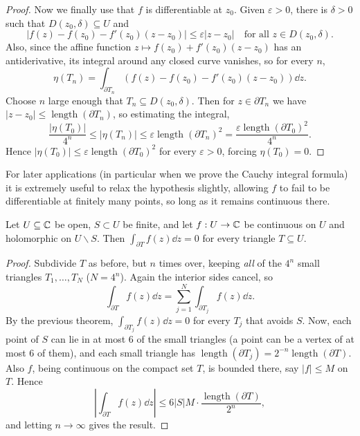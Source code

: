 \documentclass[a4paper]{scrartcl}
\begin{document}
\begin{proof}
    Now we finally use that $f$ is differentiable at $z_0$. Given $\varepsilon > 0$, there is $\delta > 0$ such that $D(z_0, \delta) \subseteq U$ and
    $$
    |f(z) - f(z_0) - f'(z_0)(z - z_0)| \leq \varepsilon|z - z_0| \quad \text{for all } z \in D(z_0, \delta).
    $$
    Also, since the affine function $z \mapsto f(z_0) + f'(z_0)(z - z_0)$ has an antiderivative, its integral around any closed curve vanishes, so for every $n$,
    $$
    \eta(T_n) = \int_{\partial T_n} \left(f(z) - f(z_0) - f'(z_0)(z - z_0)\right) \dd z.
    $$
    Choose $n$ large enough that $T_n \subseteq D(z_0, \delta)$. Then for $z \in \partial T_n$ we have $|z - z_0| \leq \operatorname{length}(\partial T_n)$, so estimating the integral,
    $$
    \frac{|\eta(T_0)|}{4^n} \leq |\eta(T_n)| \leq \varepsilon \operatorname{length}(\partial T_n)^2 = \frac{\varepsilon \operatorname{length}(\partial T_0)^2}{4^n}.
    $$
    Hence $|\eta(T_0)| \leq \varepsilon \operatorname{length}(\partial T_0)^2$ for every $\varepsilon > 0$, forcing $\eta(T_0) = 0$.
\end{proof}

For later applications (in particular when we prove the Cauchy integral formula) it is extremely useful to relax the hypothesis slightly, allowing $f$ to fail to be differentiable at finitely many points, so long as it remains continuous there.

\begin{theorem}
    Let $U \subseteq \mathbb{C}$ be open, $S \subset U$ be finite, and let $f: U \rightarrow \mathbb{C}$ be continuous on $U$ and holomorphic on $U \backslash S$. Then $\int_{\partial T} f(z) \dd z = 0$ for every triangle $T \subseteq U$.
\end{theorem}
\begin{proof}
    Subdivide $T$ as before, but $n$ times over, keeping \emph{all} of the $4^n$ small triangles $T_1, \dots, T_N$ ($N = 4^n$). Again the interior sides cancel, so
    $$
    \int_{\partial T} f(z) \dd z = \sum_{j = 1}^{N} \int_{\partial T_j} f(z) \dd z.
    $$
    By the previous theorem, $\int_{\partial T_j} f(z) \dd z = 0$ for every $T_j$ that avoids $S$. Now, each point of $S$ can lie in at most $6$ of the small triangles (a point can be a vertex of at most $6$ of them), and each small triangle has $\operatorname{length}(\partial T_j) = 2^{-n}\operatorname{length}(\partial T)$. Also $f$, being continuous on the compact set $T$, is bounded there, say $|f| \leq M$ on $T$. Hence
    $$
    \left|\int_{\partial T} f(z) \dd z\right| \leq 6 |S| M \cdot \frac{\operatorname{length}(\partial T)}{2^n},
    $$
    and letting $n \rightarrow \infty$ gives the result.
\end{proof}
\end{document}
